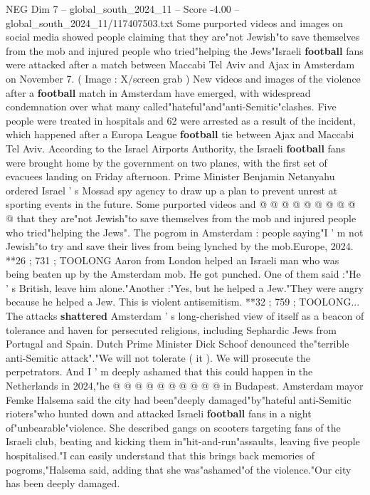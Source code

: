\begin{textsample}{NEG Dim 7 – global\_south\_2024\_11 – Score -4.00 – global\_south\_2024\_11/117407503.txt}  \label{ex:f7_neg_436}
Some purported videos and images on social media showed people claiming that they are"not Jewish"to save themselves from the mob and injured people who tried"helping the Jews"Israeli \textbf{football} fans were attacked after a match between Maccabi Tel Aviv and Ajax in Amsterdam on November 7. ( Image : X/screen grab ) New videos and images of the violence after a \textbf{football} match in Amsterdam have emerged, with widespread condemnation over what many called"hateful"and"anti-Semitic"clashes.
Five people were treated in hospitals and 62 were arrested as a result of the incident, which happened after a Europa League \textbf{football} tie between Ajax and Maccabi Tel Aviv.
According to the Israel Airports Authority, the Israeli \textbf{football} fans were brought home by the government on two planes, with the first set of evacuees landing on Friday afternoon.
Prime Minister Benjamin Netanyahu ordered Israel ' s Mossad spy agency to draw up a plan to prevent unrest at sporting events in the future.
Some purported videos and @ @ @ @ @ @ @ @ @ @ that they are"not Jewish"to save themselves from the mob and injured people who tried"helping the Jews".
The pogrom in Amsterdam : people saying"I ' m not Jewish"to try and save their lives from being lynched by the mob.Europe, 2024. **26 ; 731 ; TOOLONG Aaron from London helped an Israeli man who was being beaten up by the Amsterdam mob.
He got punched.
One of them said :"He ' s British, leave him alone."Another :"Yes, but he helped a Jew."They were angry because he helped a Jew.
This is violent antisemitism. **32 ; 759 ; TOOLONG...
The attacks \textbf{shattered} Amsterdam ' s long-cherished view of itself as a beacon of tolerance and haven for persecuted religions, including Sephardic Jews from Portugal and Spain.
Dutch Prime Minister Dick Schoof denounced the"terrible anti-Semitic attack"."We will not tolerate ( it ).
We will prosecute the perpetrators.
And I ' m deeply ashamed that this could happen in the Netherlands in 2024,"he @ @ @ @ @ @ @ @ @ @ in Budapest.
Amsterdam mayor Femke Halsema said the city had been"deeply damaged"by"hateful anti-Semitic rioters"who hunted down and attacked Israeli \textbf{football} fans in a night of"unbearable"violence.
She described gangs on scooters targeting fans of the Israeli club, beating and kicking them in"hit-and-run"assaults, leaving five people hospitalised."I can easily understand that this brings back memories of pogroms,"Halsema said, adding that she was"ashamed"of the violence."Our city has been deeply damaged.

\end{textsample}
